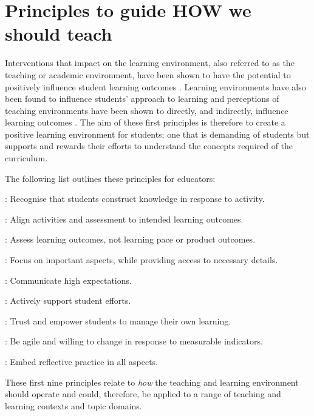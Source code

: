 \clearpage


\section{Principles to guide HOW we should teach} %
\label{sub:how_principles}

Interventions that impact on the learning environment, also referred to as the teaching or academic environment, have been shown to have the potential to positively influence student learning outcomes \cite{Trigwell:1991}. Learning environments have also been found to influence students' approach to learning \cite{Entwistle:1990,Entwistle:1991,Kember:2007} and perceptions of teaching environments have been shown to directly, and indirectly, influence learning outcomes \cite{Meyer:1990,Lizzio:2002}. The aim of these first principles is therefore to create a positive learning environment for students; one that is demanding of students but supports and rewards their efforts to understand the concepts required of the curriculum. 

The following list outlines these principles for educators:
\begin{description}
	\item [\Pref{itm:construct}]: Recognise that students construct knowledge in response to activity.
	\item [\Pref{itm:align}]: Align activities and assessment to intended learning outcomes.
	\item [\Pref{itm:formative}]: Assess learning outcomes, not learning pace or product outcomes. 
	\item [\Pref{itm:focus}]: Focus on important aspects, while providing access to necessary details.
	\item [\Pref{itm:expectations}]: Communicate high expectations.
	\item [\Pref{itm:support}]: Actively support student efforts.
	\item [\Pref{itm:theory_y}]: Trust and empower students to manage their own learning.
	\item [\Pref{itm:agile}]: Be agile and willing to change in response to measurable indicators.
	\item [\Pref{itm:reflect}]: Embed reflective practice in all aspects.
\end{description}

These first nine principles relate to \emph{how} the teaching and learning environment should operate and could, therefore, be applied to a range of teaching and learning contexts and topic domains.

